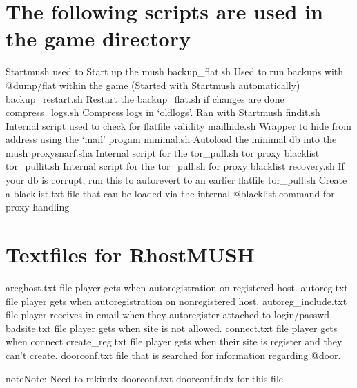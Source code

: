 \documentclass[letterpaper,10pt,english]{sphinxmanual}
\begin{document}
\section{The following scripts are used in the game directory}
\label{\detokenize{maintenance:the-following-scripts-are-used-in-the-game-directory}}
\sphinxAtStartPar
Startmush               \textendash{} used to Start up the mush
backup\_flat.sh          \textendash{} Used to run backups with @dump/flat within the game (Started with Startmush automatically)
backup\_restart.sh       \textendash{} Restart the backup\_flat.sh if changes are done
compress\_logs.sh        \textendash{} Compress logs in ‘oldlogs’.  Ran with Startmush
findit.sh               \textendash{} Internal script used to check for flatfile validity
mailhide.sh             \textendash{} Wrapper to hide from address using the ‘mail’ progam
minimal.sh              \textendash{} Auto\sphinxhyphen{}load the minimal db into the mush
proxysnarf.sha          \textendash{} Internal script for the tor\_pull.sh tor proxy blacklist
tor\_pullit.sh           \textendash{} Internal script for the tor\_pull.sh for proxy blacklist
recovery.sh             \textendash{} If your db is corrupt, run this to auto\sphinxhyphen{}revert to an earlier flatfile
tor\_pull.sh             \textendash{} Create a blacklist.txt file that can be loaded via the internal @blacklist command for proxy handling


\section{Textfiles for RhostMUSH}
\label{\detokenize{maintenance:textfiles-for-rhostmush}}
\sphinxAtStartPar
areghost.txt           \sphinxhyphen{} file player gets when autoregistration on registered host.
autoreg.txt            \sphinxhyphen{} file player gets when autoregistration on non\sphinxhyphen{}registered host.
autoreg\_include.txt    \sphinxhyphen{} file player receives in email when they autoregister attached to login/passwd
badsite.txt            \sphinxhyphen{} file player gets when site is not allowed.
connect.txt            \sphinxhyphen{} file player gets when connect
create\_reg.txt         \sphinxhyphen{} file player gets when their site is register and they can’t create.
doorconf.txt           \sphinxhyphen{} file that is searched for information regarding @door.

\begin{sphinxadmonition}{note}{Note:}
\sphinxAtStartPar
Need to mkindx doorconf.txt doorconf.indx for this file
\end{sphinxadmonition}
\end{document}
